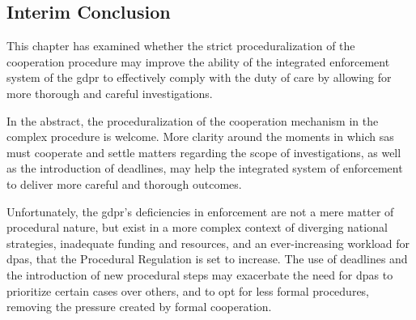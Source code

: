 \subsection{Interim Conclusion}
\label{sec:ch4-interim-conclusion}

This chapter has examined whether the strict proceduralization of the cooperation procedure may improve the ability of the integrated enforcement system of the \gls{gdpr} to effectively comply with the duty of care by allowing for more thorough and careful investigations.

In the abstract, the proceduralization of the cooperation mechanism in the complex procedure is welcome. 
More clarity around the moments in which \glspl{sa} must cooperate and settle matters regarding the scope of investigations, as well as the introduction of deadlines, may help the integrated system of enforcement to deliver more careful and thorough outcomes.

Unfortunately, the \gls{gdpr}'s deficiencies in enforcement are not a mere matter of procedural nature, but exist in a more complex context of diverging national strategies, inadequate funding and resources, and an ever-increasing workload for \glspl{dpa}, that the Procedural Regulation is set to increase.
The use of deadlines and the introduction of new procedural steps may exacerbate the need for \glspl{dpa} to prioritize certain cases over others, and to opt for less formal procedures, removing the pressure created by formal cooperation.
